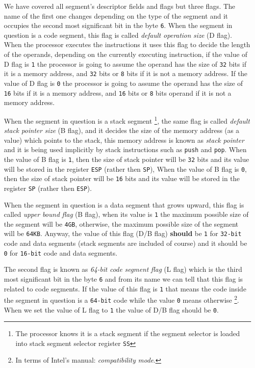 We have covered all segment's descriptor fields and flags but three
flags. The name of the first one changes depending on the type of the
segment and it occupies the second most significant bit in the byte
\lstinline!6!. When the segment in question is a code segment, this flag
is called \emph{default operation size} (D flag). When the processor
executes the instructions it uses this flag to decide the length of the
operands, depending on the currently executing instruction, if the value
of D flag is \lstinline!1! the processor is going to assume the operand
has the size of \lstinline!32! bits if it is a memory address, and
\lstinline!32! bits or \lstinline!8! bits if it is not a memory address.
If the value of D flag is \lstinline!0! the processor is going to assume
the operand has the size of \lstinline!16! bits if it is a memory
address, and \lstinline!16! bits or \lstinline!8! bits operand if it is
not a memory address.

When the segment in question is a stack segment \footnote{The processor
  knows it is a stack segment if the segment selector is loaded into
  stack segment selector register \lstinline!SS!}, the same flag is
called \emph{default stack pointer size} (B flag), and it decides the
size of the memory address (as a value) which points to the stack, this
memory address is known as \emph{stack pointer} and it is being used
implicitly by stack instructions such as \lstinline!push! and
\lstinline!pop!. When the value of B flag is \lstinline!1!, then the
size of stack pointer will be \lstinline!32! bits and its value will be
stored in the register \lstinline!ESP! (rather then \lstinline!SP!),
When the value of B flag is \lstinline!0!, then the size of stack
pointer will be \lstinline!16! bits and its value will be stored in the
register \lstinline!SP! (rather then \lstinline!ESP!).

When the segment in question is a data segment that grows upward, this
flag is called \emph{upper bound flag} (B flag), when its value is
\lstinline!1! the maximum possible size of the segment will be
\lstinline!4GB!, otherwise, the maximum possible size of the segment
will be \lstinline!64KB!. Anyway, the value of this flag (D/B flag)
\textbf{should} be \lstinline!1! for \lstinline!32-bit! code and data
segments (stack segments are included of course) and it should be
\lstinline!0! for \lstinline!16-bit! code and data segments.

The second flag is known as \emph{64-bit code segment flag} (L flag)
which is the third most significant bit in the byte \lstinline!6! and
from its name we can tell that this flag is related to code segments. If
the value of this flag is \lstinline!1! that means the code inside the
segment in question is a \lstinline!64-bit! code while the value
\lstinline!0! means otherwise \footnote{In terms of Intel's manual:
  \emph{compatibility mode}.}. When we set the value of L flag to
\lstinline!1! the value of D/B flag should be \lstinline!0!.

